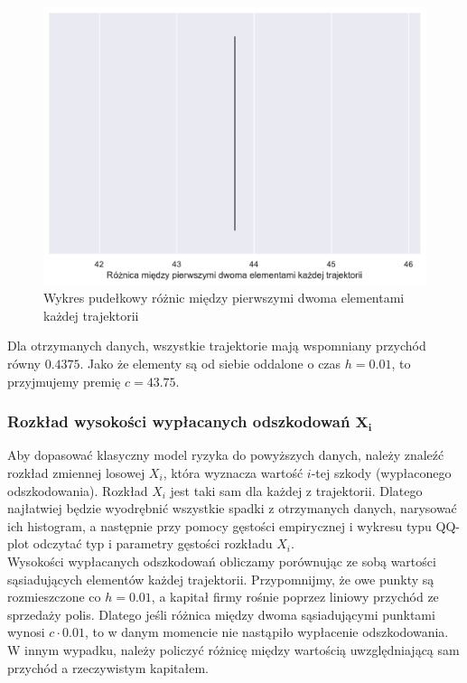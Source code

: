 \documentclass[12pt]{mwart}
\begin{document}
	\begin{figure}[H]
	\begin{center}
		\includegraphics[scale=0.5]{box1.pdf}
		\caption{Wykres pudełkowy różnic między pierwszymi dwoma elementami \newline każdej trajektorii}
	\end{center}
	\end{figure}
	
	\noindent Dla otrzymanych danych, wszystkie trajektorie mają wspomniany przychód równy $0.4375$. Jako że elementy są od siebie oddalone o czas $h=0.01$, to przyjmujemy premię $c=43.75$.
	
	\subsubsection{Rozkład wysokości wypłacanych odszkodowań $\bm{X_i}$}
	\noindent Aby dopasować klasyczny model ryzyka do powyższych danych, należy znaleźć rozkład zmiennej losowej $X_i$, która wyznacza wartość $i$-tej szkody (wypłaconego odszkodowania). Rozkład $X_i$ jest taki sam dla każdej z trajektorii. Dlatego najłatwiej będzie wyodrębnić wszystkie spadki z otrzymanych danych, narysować ich histogram, a następnie przy pomocy gęstości empirycznej i wykresu typu QQ-plot odczytać typ i parametry gęstości rozkładu $X_i$. \\
	
	\noindent Wysokości wypłacanych odszkodowań obliczamy porównując ze sobą wartości sąsiadujących elementów każdej trajektorii. Przypomnijmy, że owe punkty są rozmieszczone co $h=0.01$, a kapitał firmy rośnie poprzez liniowy przychód ze sprzedaży polis. Dlatego jeśli różnica między dwoma sąsiadującymi punktami wynosi $c\cdot 0.01$, to w danym momencie nie nastąpiło wypłacenie odszkodowania. W innym wypadku, należy policzyć różnicę między wartością uwzględniającą sam przychód a rzeczywistym kapitałem. \\
	
\end{document}

